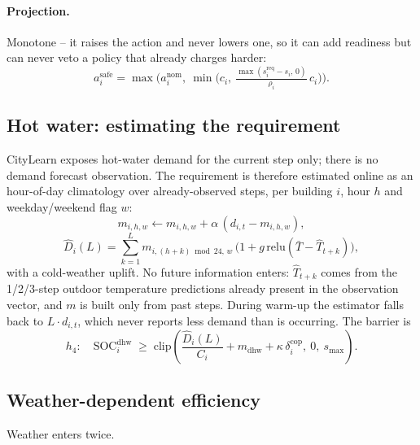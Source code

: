\documentclass[11pt]{article}
\begin{document}
\paragraph{Projection.} Monotone -- it raises the action and never lowers one, so
it can add readiness but can never veto a policy that already charges harder:
\begin{equation}
a^{\text{safe}}_i = \max\Big(a^{\text{nom}}_i,\ \min\big(c_i,\ \tfrac{\max(s^{\text{req}}_i - s_i,\,0)}{\rho_i}\,c_i\big)\Big).
\label{eq:deadline-projection}
\end{equation}

\subsection{Hot water: estimating the requirement}
\label{sec:dhw-forecast}

CityLearn exposes hot-water demand for the current step only; there is no demand
forecast observation. The requirement is therefore estimated online as an
hour-of-day climatology over already-observed steps, per building $i$, hour $h$
and weekday/weekend flag $w$:
\begin{equation}
m_{i,h,w} \leftarrow m_{i,h,w} + \alpha\,(d_{i,t} - m_{i,h,w}),
\label{eq:ewma}
\end{equation}
\begin{equation}
\hat D_i(L) = \sum_{k=1}^{L} m_{i,(h+k)\bmod 24,\,w}\,\big(1 + g\,\mathrm{relu}(\bar T - \hat T_{t+k})\big),
\label{eq:dhw-forecast}
\end{equation}
with a cold-weather uplift. No future information enters: $\hat T_{t+k}$ comes
from the 1/2/3-step outdoor temperature predictions already present in the
observation vector, and $m$ is built only from past steps. During warm-up the
estimator falls back to $L \cdot d_{i,t}$, which never reports less demand than
is occurring. The barrier is
\begin{equation}
h_4:\quad \text{SOC}^{\text{dhw}}_i \;\geq\; \mathrm{clip}\!\left(\frac{\hat D_i(L)}{C_i} + m_{\text{dhw}} + \kappa\, \delta^{\text{cop}}_i,\ 0,\ s_{\max}\right).
\label{eq:h4}
\end{equation}

\subsection{Weather-dependent efficiency}
\label{sec:weather}

Weather enters twice.
\end{document}
